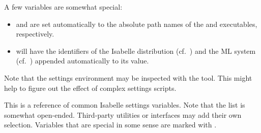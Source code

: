 \begin{isabellebody}
\begin{isamarkuptext}
  \medskip A few variables are somewhat special:

  \begin{itemize}

  \item {}\hypertarget{setting.ISABELLE-PROCESS}{\hyperlink{setting.ISABELLE-PROCESS}{\mbox{}}} and \hypertarget{setting.ISABELLE-TOOL}{\hyperlink{setting.ISABELLE-TOOL}{\mbox{}}} are set
  automatically to the absolute path names of the \hyperlink{executable.isabelle-process}{\mbox{}} and \hyperlink{executable.isabelle}{\mbox{}} executables,
  respectively.
  
  \item {}\hyperlink{setting.ISABELLE-OUTPUT}{\mbox{}} will have the identifiers of
  the Isabelle distribution (cf.\ \hyperlink{setting.ISABELLE-IDENTIFIER}{\mbox{}}) and
  the ML system (cf.\ \hyperlink{setting.ML-IDENTIFIER}{\mbox{}}) appended automatically
  to its value.

  \end{itemize}

  \medskip Note that the settings environment may be inspected with
  the \hyperlink{tool.getenv}{\mbox{}} tool.  This might help to figure out the effect
  of complex settings scripts.%
\end{isamarkuptext}%
\isamarkuptrue%
%
\isamarkuptrue%
%
\begin{isamarkuptext}%
This is a reference of common Isabelle settings variables. Note that
  the list is somewhat open-ended. Third-party utilities or interfaces
  may add their own selection. Variables that are special in some
  sense are marked with .

  \begin{description}


\end{description}
\end{isamarkuptext}
\end{isabellebody}
